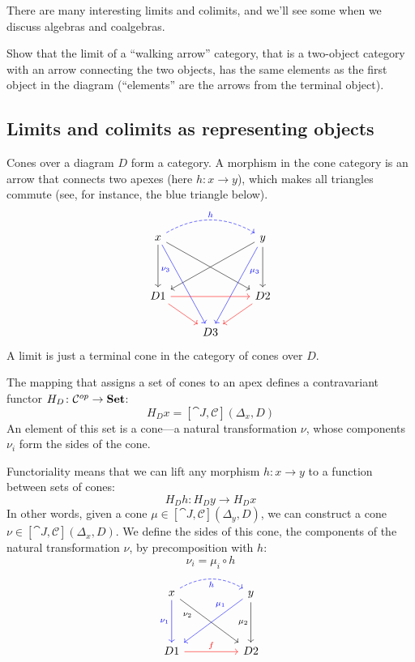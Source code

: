 \documentclass[DaoFP]{subfiles}
\begin{document}
There are many interesting limits and colimits, and we'll see some when we discuss algebras and coalgebras.

\begin{exercise}
Show that the limit of a ``walking arrow'' category, that is a two-object category with an arrow connecting the two objects, has the same elements as the first object in the diagram (``elements'' are the arrows from the terminal object).
\end{exercise}

\subsection{Limits and colimits as representing objects}

Cones over a diagram $D$ form a category. A morphism in the cone category is an arrow that connects two apexes (here $h \colon x \to y$), which makes all triangles commute (see, for instance, the blue triangle below).
\[
 \begin{tikzcd}
  x
 \arrow[rr, dashed, bend left, blue, "h"]
 \arrow[dd]
 \arrow[dddr, blue, "\nu_3"' near start]
\arrow[ddrr ]
 && y
 \arrow[ddll]
 \arrow[dddl, blue, "\mu_3" near start]
 \arrow[dd]
\\
\\
D 1 
\arrow[rr, red]
\arrow[rd, red]
&& D 2
\arrow[dl, red]
\\
& D 3
 \end{tikzcd}
 \]
 A limit is just a terminal cone in the category of cones over $D$.
 
 The mapping that assigns a set of cones to an apex defines a contravariant functor $H_D \colon \mathcal{C}^{op} \to \mathbf{Set}$:
 \[ H_D x = [\cat J, \mathcal{C}](\Delta_x, D) \]
An element of this set is a cone---a natural transformation $\nu$, whose components $\nu_i$ form the sides of the cone. 

Functoriality means that we can lift any morphism $h \colon x \to y$ to a function between sets of cones:
 \[ H_D h \colon H_D y \to H_D x \]
 In other words, given a cone $\mu \in [\cat J, \mathcal{C}](\Delta_y, D)$, we can construct a cone $\nu \in [\cat J, \mathcal{C}](\Delta_x, D)$. We define the sides of this cone, the components of the natural transformation $\nu$, by precomposition with $h$:
 \[ \nu_i = \mu_i \circ h \]
 \[
 \begin{tikzcd}
  x
 \arrow[rr, dashed, bend left, blue, "h"']
 \arrow[dd, blue,  "\nu_1"']
\arrow[ddrr, "\nu_2"' near start]
 && y
 \arrow[ddll, blue, "\mu_1"' near start]
 \arrow[dd, "\mu_2"']
\\
\\
D 1 
\arrow[rr, red, "f"]
&& D 2
 \end{tikzcd}
 \]
 
\end{document}
